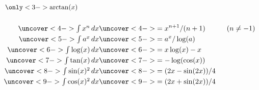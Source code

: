 \documentclass[9pt]{beamer}
\begin{document}
\begin{frame}[t]
{\[\begin{array}{rlcrl}
    \only<3->{\arctan(x)} \\
    \hphantom{mmmmmmmm} & \hphantom{mmmmmmmm} &&
    \hphantom{mmmmmmmmm} & \hphantom{mmmmmmmm} 
   \end{array} \] }
 \vspace{-6ex}
 \begin{align*}
  \uncover<4->{\textstyle\int x^n\, dx}       &
  \uncover<4->{= x^{n+1}/(n+1) \hspace{3em} (n\neq -1)} \\
  \uncover<5->{\textstyle\int a^x\, dx} &
  \uncover<5->{= a^x/\log(a)} \\
  \uncover<6->{\textstyle\int \log(x)\,dx} &
  \uncover<6->{= x\log(x) - x} \\
  \uncover<7->{\textstyle\int \tan(x)\, dx} &
  \uncover<7->{= -\log(\cos(x))} \\
  \uncover<8->{\textstyle\int \sin(x)^2\, dx} &
  \uncover<8->{= (2x-\sin(2x))/4} \\
  \uncover<9->{\textstyle\int \cos(x)^2\, dx} &
  \uncover<9->{= (2x+\sin(2x))/4} \\
 \end{align*}
\end{frame}
\end{document}
